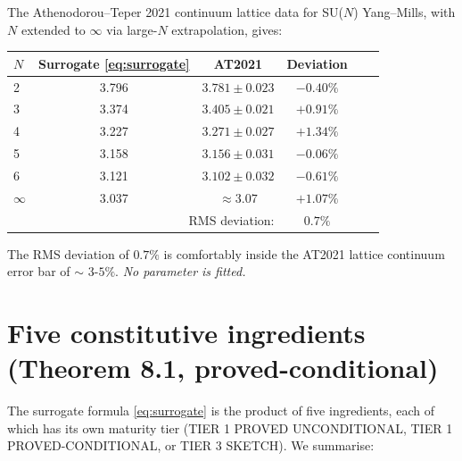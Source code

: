 \documentclass[11pt,a4paper,reqno]{amsart}
\theoremstyle{definition}
\begin{document}
The Athenodorou--Teper 2021 continuum lattice data \cite[Tab.~34]{AthenodorouTeper2021} for SU($N$) Yang--Mills, with $N$ extended to $\infty$ via large-$N$ extrapolation, gives:
\begin{center}
\begin{tabular}{lccccc}
\toprule
$N$ & Surrogate \eqref{eq:surrogate} & AT2021 & Deviation \\
\midrule
2  & 3.796 & $3.781 \pm 0.023$ & $-0.40\%$ \\
3  & 3.374 & $3.405 \pm 0.021$ & $+0.91\%$ \\
4  & 3.227 & $3.271 \pm 0.027$ & $+1.34\%$ \\
5  & 3.158 & $3.156 \pm 0.031$ & $-0.06\%$ \\
6  & 3.121 & $3.102 \pm 0.032$ & $-0.61\%$ \\
$\infty$ & 3.037 & $\approx 3.07$ & $+1.07\%$ \\
\midrule
\multicolumn{3}{r}{RMS deviation:} & $0.7\%$ & \\
\bottomrule
\end{tabular}
\end{center}
The RMS deviation of $0.7\%$ is comfortably inside the AT2021 lattice continuum
error bar of $\sim$ $3$-$5\%$. \emph{No parameter is fitted.}

\section{Five constitutive ingredients (Theorem 8.1, proved-conditional)}
\label{sec:five}

The surrogate formula \eqref{eq:surrogate} is the product of five ingredients,
each of which has its own maturity tier (TIER 1 PROVED UNCONDITIONAL, TIER 1
PROVED-CONDITIONAL, or TIER 3 SKETCH). We summarise:
\end{document}
